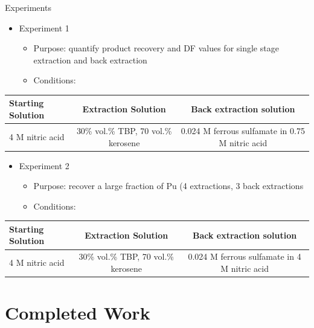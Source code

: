\documentclass{beamer}
\begin{document}
\begin{frame}{Experiments}
  \begin{itemize}
  \item{Experiment 1}
    \begin{itemize}
    \item{Purpose: quantify product recovery and DF values
      for single stage extraction and back extraction}
    \item{Conditions:}
    \end{itemize}
  \end{itemize}
  \begin{center}
    \vskip -0.2cm
    {\fontsize{2.5}{4}\selectfont
      \begin{tabular}{l  c  c}\toprule
        Starting Solution  & Extraction Solution
        & Back extraction solution \\ \midrule \vspace{0.1cm}
        4 M nitric acid & 30\% vol.\% TBP, 70 vol.\% kerosene & 0.024 M ferrous sulfamate in 0.75 M nitric acid \\ \bottomrule
      \end{tabular}
      }
  \end{center}
  \begin{itemize}
  \item{Experiment 2}
    \begin{itemize}
    \item{Purpose: recover a large fraction of Pu (4 extractions,
      3 back extractions}
    \item{Conditions:}
    \end{itemize}
  \end{itemize}
    \begin{center}
    \vskip -0.2cm
    {\fontsize{2.5}{4}\selectfont
      \begin{tabular}{l  c  c}\toprule
        Starting Solution  & Extraction Solution
        & Back extraction solution \\ \midrule \vspace{0.1cm}
        4 M nitric acid & 30\% vol.\% TBP, 70 vol.\% kerosene & 0.024 M ferrous sulfamate in 4 M nitric acid \\ \bottomrule
      \end{tabular}
      }
  \end{center}
\end{frame}

\section{Completed Work}
\begin{frame}
\sectionpage
\end{frame}
\end{document}
